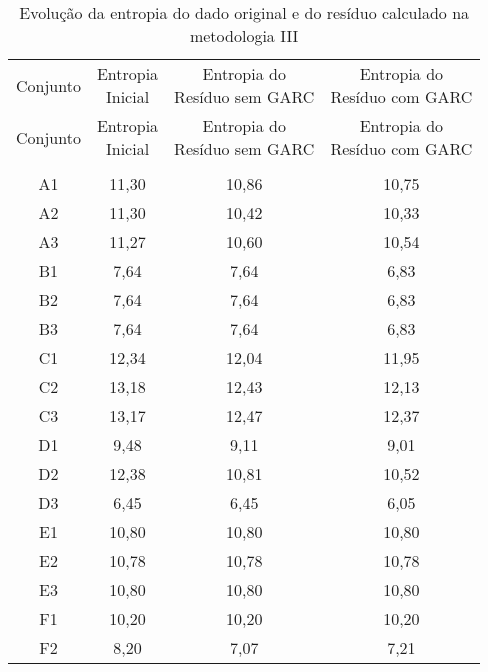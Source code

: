 \begin{center}
\begin{longtable}{cccc}
\toprule
\rowcolor{white}
\caption[Metodologia III: evolução da entropia]{Evolução da entropia do dado
original e do resíduo calculado na metodologia III}
\label{tab:EvolucaoEntropiaMet3}\\
\midrule
Conjunto & \specialcell{Entropia \\Inicial} & \specialcell{Entropia do
\\Resíduo sem GARC} & \specialcell{Entropia do
\\Resíduo com GARC}  \\
\midrule
\endfirsthead
\midrule
\rowcolor{white}
Conjunto & \specialcell{Entropia \\Inicial} & \specialcell{Entropia do
\\Resíduo sem GARC} & \specialcell{Entropia do
\\Resíduo com GARC}  \\
\toprule
\endhead
\midrule \\ %
\endfoot
\bottomrule 
\endlastfoot
    A1    & 11,30 & 10,86 & 10,75 \\
    A2    & 11,30 & 10,42 & 10,33 \\
    A3    & 11,27 & 10,60 & 10,54 \\
    B1    & 7,64  & 7,64  & 6,83 \\
    B2    & 7,64  & 7,64  & 6,83 \\
    B3    & 7,64  & 7,64  & 6,83 \\
    C1    & 12,34 & 12,04 & 11,95 \\
    C2    & 13,18 & 12,43 & 12,13 \\
    C3    & 13,17 & 12,47 & 12,37 \\
    D1    & 9,48  & 9,11  & 9,01 \\
    D2    & 12,38 & 10,81 & 10,52 \\
    D3    & 6,45  & 6,45  & 6,05 \\
    E1    & 10,80 & 10,80 & 10,80 \\
    E2    & 10,78 & 10,78 & 10,78 \\
    E3    & 10,80 & 10,80 & 10,80 \\
    F1    & 10,20 & 10,20 & 10,20 \\
    F2    & 8,20  & 7,07  & 7,21 \\

\end{longtable}
\end{center}
